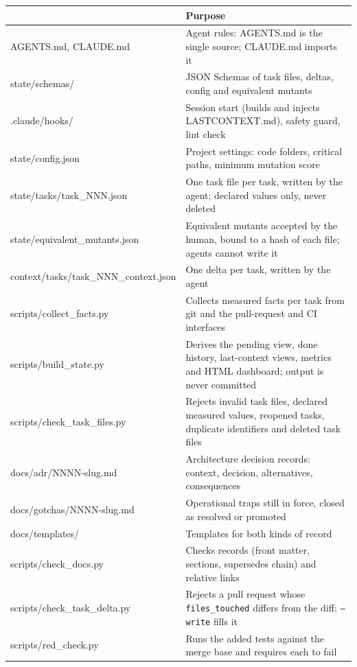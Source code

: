 \documentclass[11pt,a4paper]{article}
\begin{document}
\begin{table}[H]
\centering
\small
\begin{tabularx}{\textwidth}{@{}>{\footnotesize\ttfamily\raggedright\arraybackslash}p{6.9cm}>{\raggedright\arraybackslash}X@{}}
\toprule
\multicolumn{1}{@{}l}{\textbf{Path}} & \textbf{Purpose}\\
\midrule
AGENTS.md, CLAUDE.md & Agent rules: AGENTS.md is the single source; CLAUDE.md imports it\\
state/schemas/ & JSON Schemas of task files, deltas, config and equivalent mutants\\
.claude/hooks/ & Session start (builds and injects LASTCONTEXT.md), safety guard, lint check\\
state/config.json & Project settings: code folders, critical paths, minimum mutation score\\
state/tasks/task\_NNN.json & One task file per task, written by the agent; declared values only, never deleted\\
state/equivalent\_mutants.json & Equivalent mutants accepted by the human, bound to a hash of each file; agents cannot write it\\
context/tasks/task\_NNN\_context.json & One delta per task, written by the agent\\
scripts/collect\_facts.py & Collects measured facts per task from git and the pull-request and CI interfaces\\
scripts/build\_state.py & Derives the pending view, done history, last-context views, metrics and HTML dashboard; output is never committed\\
scripts/check\_task\_files.py & Rejects invalid task files, declared measured values, reopened tasks, duplicate identifiers and deleted task files\\
docs/adr/NNNN-slug.md & Architecture decision records: context, decision, alternatives, consequences\\
docs/gotchas/NNNN-slug.md & Operational traps still in force, closed as resolved or promoted\\
docs/templates/ & Templates for both kinds of record\\
scripts/check\_docs.py & Checks records (front matter, sections, supersedes chain) and relative links\\
scripts/check\_task\_delta.py & Rejects a pull request whose \texttt{files\_touched} differs from the diff; \texttt{--write} fills it\\
scripts/red\_check.py & Runs the added tests against the merge base and requires each to fail\\

\end{tabularx}
\end{table}
\end{document}
